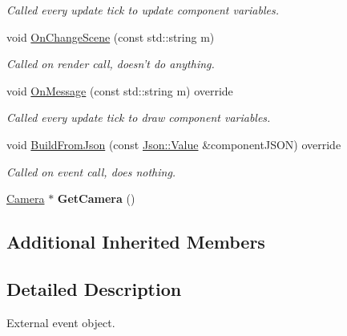 \begin{DoxyCompactItemize}
\begin{DoxyCompactList}\small\item\em Called every update tick to update component variables. \end{DoxyCompactList}\item 
void \hyperlink{class_event_camera_component_a2eb23cc4f6598a99afacf89d999476e2}{On\+Change\+Scene} (const std\+::string m)
\begin{DoxyCompactList}\small\item\em Called on render call, doesn't do anything. \end{DoxyCompactList}\item 
\hypertarget{class_event_camera_component_a0de9c713b1c9cbb98b8528080fb81adb}{void \hyperlink{class_event_camera_component_a0de9c713b1c9cbb98b8528080fb81adb}{On\+Message} (const std\+::string m) override}\label{class_event_camera_component_a0de9c713b1c9cbb98b8528080fb81adb}

\begin{DoxyCompactList}\small\item\em Called every update tick to draw component variables. \end{DoxyCompactList}\item 
void \hyperlink{class_event_camera_component_a47edd4b0e80549fa677b3ff02465e62e}{Build\+From\+Json} (const \hyperlink{class_json_1_1_value}{Json\+::\+Value} \&component\+J\+S\+O\+N) override
\begin{DoxyCompactList}\small\item\em Called on event call, does nothing. \end{DoxyCompactList}\item 
\hypertarget{class_event_camera_component_ae8ffe14e924fbd153eb2101acf180fed}{\hyperlink{class_camera}{Camera} $\ast$ {\bfseries Get\+Camera} ()}\label{class_event_camera_component_ae8ffe14e924fbd153eb2101acf180fed}

\end{DoxyCompactItemize}
\subsection*{Additional Inherited Members}


\subsection{Detailed Description}
External event object. 

